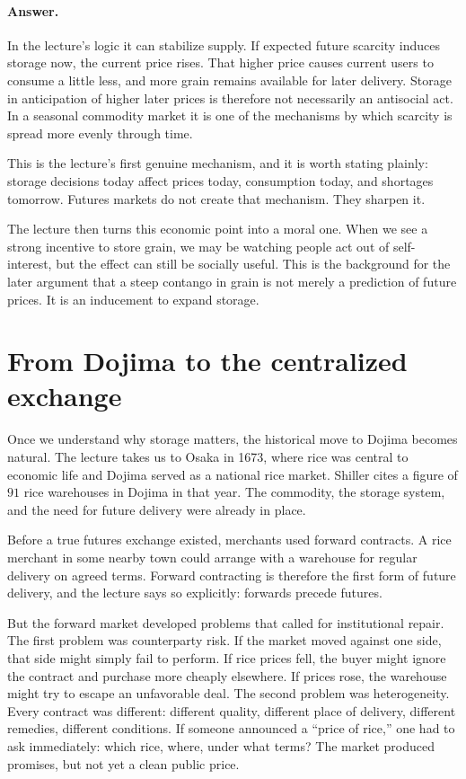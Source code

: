 \paragraph{Answer.} In the lecture's logic it can stabilize supply. If expected future scarcity induces storage now, the current price rises. That higher price causes current users to consume a little less, and more grain remains available for later delivery. Storage in anticipation of higher later prices is therefore not necessarily an antisocial act. In a seasonal commodity market it is one of the mechanisms by which scarcity is spread more evenly through time.

This is the lecture's first genuine mechanism, and it is worth stating plainly: storage decisions today affect prices today, consumption today, and shortages tomorrow. Futures markets do not create that mechanism. They sharpen it.

The lecture then turns this economic point into a moral one. When we see a strong incentive to store grain, we may be watching people act out of self-interest, but the effect can still be socially useful. This is the background for the later argument that a steep contango in grain is not merely a prediction of future prices. It is an inducement to expand storage.

\section{From Dojima to the centralized exchange}

Once we understand why storage matters, the historical move to Dojima becomes natural. The lecture takes us to Osaka in 1673, where rice was central to economic life and Dojima served as a national rice market. Shiller cites a figure of $91$ rice warehouses in Dojima in that year. The commodity, the storage system, and the need for future delivery were already in place.

Before a true futures exchange existed, merchants used forward contracts. A rice merchant in some nearby town could arrange with a warehouse for regular delivery on agreed terms. Forward contracting is therefore the first form of future delivery, and the lecture says so explicitly: forwards precede futures.

But the forward market developed problems that called for institutional repair. The first problem was counterparty risk. If the market moved against one side, that side might simply fail to perform. If rice prices fell, the buyer might ignore the contract and purchase more cheaply elsewhere. If prices rose, the warehouse might try to escape an unfavorable deal. The second problem was heterogeneity. Every contract was different: different quality, different place of delivery, different remedies, different conditions. If someone announced a ``price of rice,'' one had to ask immediately: which rice, where, under what terms? The market produced promises, but not yet a clean public price.

